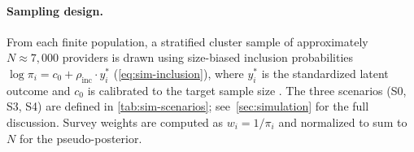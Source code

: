 \paragraph{Sampling design.}
From each finite population, a stratified cluster sample of
approximately $N \approx 7{,}000$ providers is drawn using
size-biased inclusion probabilities
$\log\pi_i = c_0 + \rho_{\mathrm{inc}} \cdot y_i^*$
(\cref{eq:sim-inclusion}), where $y_i^*$ is the standardized
latent outcome and $c_0$ is calibrated to the target sample size
\citep[cf.][]{SavitskyToth2016}.
The three scenarios (S0, S3, S4) are defined in
\cref{tab:sim-scenarios}; see~\cref{sec:simulation} for the
full discussion.  Survey weights are computed as
$w_i = 1/\pi_i$ and normalized to sum to~$N$ for the
pseudo-posterior.
